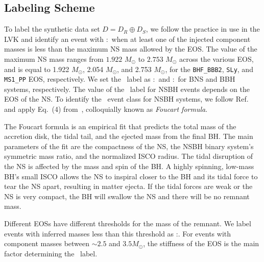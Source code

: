 \subsection{Labeling Scheme}


To label the synthetic data set $D=D_R\oplus D_S$, we follow the practice in use in the \ac{LVK} and identify an event with \hasns:\true\ when at least one of the injected component masses
is less than the maximum \ac{NS} mass allowed by the \ac{EOS}. The value of the maximum \ac{NS} mass ranges from $1.922$ $M_{\odot}$ to $2.753$ $M_{\odot}$ across the various \ac{EOS}, and is equal to
1.922 $M_\odot$, 2.054 $M_\odot$, and 2.753 $M_\odot$, for the {\tt BHF\_BBB2}, {\tt SLy}, and {\tt MS1\_PP} \ac{EOS}, respectively. We set the \hasrem\ label as \hasrem:\true\ and \hasrem:\false\ for \ac{BNS} and \ac{BBH} systems, respectively. The value of the \hasrem\
label for \ac{NSBH} events depends on the \ac{EOS} of the \ac{NS}. To identify the \hasrem\ event class for \ac{NSBH} systems,  we follow Ref.~\cite{Chatterjee:2019avs} and apply Eq.~(4)
from~\cite{Foucart:2018rjc}, colloquially known as \emph{Foucart formula}.

The Foucart formula is an empirical fit that predicts the total mass of the accretion disk, the tidal tail, and the ejected mass from the final \ac{BH}. The main parameters of the fit are
the compactness of the \ac{NS},  the \ac{NSBH} binary system's symmetric mass ratio, and the normalized \ac{ISCO} radius. The tidal disruption of the \ac{NS} is affected by the mass and spin of the \ac{BH}. A highly spinning, low-mass \ac{BH}'s small ISCO allows the \ac{NS} to inspiral closer to the \ac{BH} and its tidal force to tear the \ac{NS} apart, resulting in matter ejecta. If the tidal forces are weak or the \ac{NS} is very compact, the \ac{BH} will swallow the \ac{NS} and there will be no remnant mass.

Different \ac{EOS}s have different thresholds for the mass of the remnant. We label events with inferred masses less than this threshold as \hasrem:\true. For events with component masses between $\sim 2.5$ and $3.5 M_{\odot}$, the stiffness of the \ac{EOS} is the main factor determining the \hasrem\ label.
